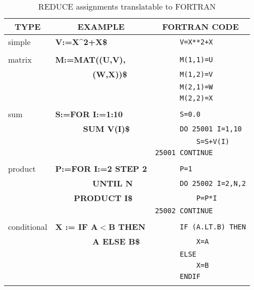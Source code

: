 \begin{table}
\begin{tabular}{||l|l|l||}\hline\hline
\multicolumn{1}{||c|}{\bf TYPE} & \multicolumn{1}{c|}{\bf EXAMPLE}
 & \multicolumn{1}{c||}{\bf FORTRAN CODE} \\ \hline\hline
    simple     &{\bf V:=X\^{}2+X\$} &\verb!      V=X**2+X!\\
& & \\
    matrix     &{\bf M:=MAT((U,V),} &\verb!      M(1,1)=U!\\
& {\bf\ \ \ \ \ \ \ \ (W,X))\$ } &\verb!      M(1,2)=V!\\
& &\verb!      M(2,1)=W!\\
& &\verb!      M(2,2)=X!\\
& & \\
    sum &{\bf S:=FOR I:=1:10} &\verb!      S=0.0!\\
&{\bf\ \ \ \ \ \ SUM V(I)\$} &\verb!      DO 25001 I=1,10!\\
& &\verb!          S=S+V(I)!\\
& &\verb!25001 CONTINUE!\\
& & \\
    product    &{\bf P:=FOR I:=2 STEP 2} &\verb!      P=1!\\
&{\bf\ \ \ \ \ \ \ \ UNTIL N} &\verb!      DO 25002 I=2,N,2!\\
&{\bf \ \ \ \ PRODUCT I\$} &\verb!          P=P*I!\\
& &\verb!25002 CONTINUE!\\
& & \\
conditional & {\bf X := IF A$<$B THEN} &\verb!      IF (A.LT.B) THEN!\\
& {\bf \ \ \ \ \ \ \ \ A ELSE B\$} &\verb!          X=A!\\
& &\verb!      ELSE!\\
& &\verb!          X=B!\\
& &\verb!      ENDIF!\\
& & \\ \hline\hline
\end{tabular}
\caption{REDUCE assignments translatable to FORTRAN}
\end{table}

